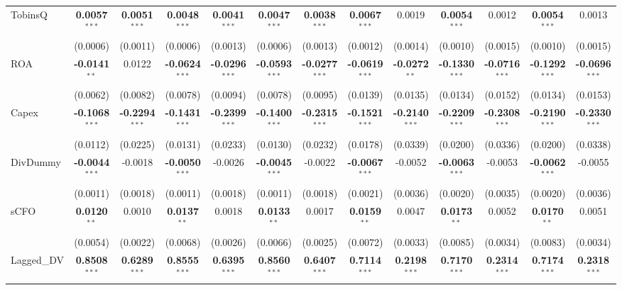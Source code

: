 \begin{landscape}
\begin{table}[H]
\begin{tabular}{lcccccccccccc}
TobinsQ & \textbf{0.0057}$^{***}$ & \textbf{0.0051}$^{***}$ & \textbf{0.0048}$^{***}$ & \textbf{0.0041}$^{***}$ & \textbf{0.0047}$^{***}$ & \textbf{0.0038}$^{***}$ & \textbf{0.0067}$^{***}$ & 0.0019 & \textbf{0.0054}$^{***}$ & 0.0012 & \textbf{0.0054}$^{***}$ & 0.0013 \\
 & (0.0006) & (0.0011) & (0.0006) & (0.0013) & (0.0006) & (0.0013) & (0.0012) & (0.0014) & (0.0010) & (0.0015) & (0.0010) & (0.0015) \\
ROA & \textbf{-0.0141}$^{**}$ & 0.0122 & \textbf{-0.0624}$^{***}$ & \textbf{-0.0296}$^{***}$ & \textbf{-0.0593}$^{***}$ & \textbf{-0.0277}$^{***}$ & \textbf{-0.0619}$^{***}$ & \textbf{-0.0272}$^{**}$ & \textbf{-0.1330}$^{***}$ & \textbf{-0.0716}$^{***}$ & \textbf{-0.1292}$^{***}$ & \textbf{-0.0696}$^{***}$ \\
 & (0.0062) & (0.0082) & (0.0078) & (0.0094) & (0.0078) & (0.0095) & (0.0139) & (0.0135) & (0.0134) & (0.0152) & (0.0134) & (0.0153) \\
Capex & \textbf{-0.1068}$^{***}$ & \textbf{-0.2294}$^{***}$ & \textbf{-0.1431}$^{***}$ & \textbf{-0.2399}$^{***}$ & \textbf{-0.1400}$^{***}$ & \textbf{-0.2315}$^{***}$ & \textbf{-0.1521}$^{***}$ & \textbf{-0.2140}$^{***}$ & \textbf{-0.2209}$^{***}$ & \textbf{-0.2308}$^{***}$ & \textbf{-0.2190}$^{***}$ & \textbf{-0.2330}$^{***}$ \\
 & (0.0112) & (0.0225) & (0.0131) & (0.0233) & (0.0130) & (0.0232) & (0.0178) & (0.0339) & (0.0200) & (0.0336) & (0.0200) & (0.0338) \\
DivDummy & \textbf{-0.0044}$^{***}$ & -0.0018 & \textbf{-0.0050}$^{***}$ & -0.0026 & \textbf{-0.0045}$^{***}$ & -0.0022 & \textbf{-0.0067}$^{***}$ & -0.0052 & \textbf{-0.0063}$^{***}$ & -0.0053 & \textbf{-0.0062}$^{***}$ & -0.0055 \\
 & (0.0011) & (0.0018) & (0.0011) & (0.0018) & (0.0011) & (0.0018) & (0.0021) & (0.0036) & (0.0020) & (0.0035) & (0.0020) & (0.0036) \\
sCFO & \textbf{0.0120}$^{**}$ & 0.0010 & \textbf{0.0137}$^{**}$ & 0.0018 & \textbf{0.0133}$^{**}$ & 0.0017 & \textbf{0.0159}$^{**}$ & 0.0047 & \textbf{0.0173}$^{**}$ & 0.0052 & \textbf{0.0170}$^{**}$ & 0.0051 \\
 & (0.0054) & (0.0022) & (0.0068) & (0.0026) & (0.0066) & (0.0025) & (0.0072) & (0.0033) & (0.0085) & (0.0034) & (0.0083) & (0.0034) \\
Lagged\_DV & \textbf{0.8508}$^{***}$ & \textbf{0.6289}$^{***}$ & \textbf{0.8555}$^{***}$ & \textbf{0.6395}$^{***}$ & \textbf{0.8560}$^{***}$ & \textbf{0.6407}$^{***}$ & \textbf{0.7114}$^{***}$ & \textbf{0.2198}$^{***}$ & \textbf{0.7170}$^{***}$ & \textbf{0.2314}$^{***}$ & \textbf{0.7174}$^{***}$ & \textbf{0.2318}$^{***}$ \\

\end{tabular}
\end{table}
\end{landscape}
